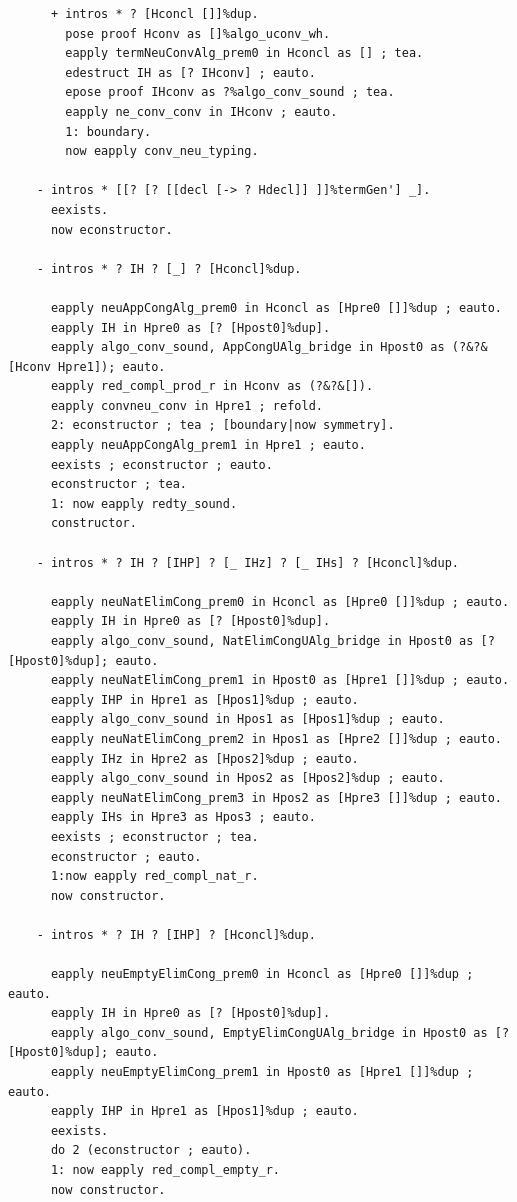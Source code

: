 \documentclass[10pt,a4paper]{amsart}
\begin{document}
\begin{lstlisting}
      + intros * ? [Hconcl []]%dup.
        pose proof Hconv as []%algo_uconv_wh.
        eapply termNeuConvAlg_prem0 in Hconcl as [] ; tea.
        edestruct IH as [? IHconv] ; eauto.
        epose proof IHconv as ?%algo_conv_sound ; tea.
        eapply ne_conv_conv in IHconv ; eauto.
        1: boundary.
        now eapply conv_neu_typing.

    - intros * [[? [? [[decl [-> ? Hdecl]] ]]%termGen'] _].
      eexists.
      now econstructor.

    - intros * ? IH ? [_] ? [Hconcl]%dup.

      eapply neuAppCongAlg_prem0 in Hconcl as [Hpre0 []]%dup ; eauto.
      eapply IH in Hpre0 as [? [Hpost0]%dup].
      eapply algo_conv_sound, AppCongUAlg_bridge in Hpost0 as (?&?&[Hconv Hpre1]); eauto.
      eapply red_compl_prod_r in Hconv as (?&?&[]).
      eapply convneu_conv in Hpre1 ; refold.
      2: econstructor ; tea ; [boundary|now symmetry].
      eapply neuAppCongAlg_prem1 in Hpre1 ; eauto.
      eexists ; econstructor ; eauto.
      econstructor ; tea.
      1: now eapply redty_sound.
      constructor.

    - intros * ? IH ? [IHP] ? [_ IHz] ? [_ IHs] ? [Hconcl]%dup.

      eapply neuNatElimCong_prem0 in Hconcl as [Hpre0 []]%dup ; eauto.
      eapply IH in Hpre0 as [? [Hpost0]%dup].
      eapply algo_conv_sound, NatElimCongUAlg_bridge in Hpost0 as [? [Hpost0]%dup]; eauto.
      eapply neuNatElimCong_prem1 in Hpost0 as [Hpre1 []]%dup ; eauto.
      eapply IHP in Hpre1 as [Hpos1]%dup ; eauto.
      eapply algo_conv_sound in Hpos1 as [Hpos1]%dup ; eauto.
      eapply neuNatElimCong_prem2 in Hpos1 as [Hpre2 []]%dup ; eauto.
      eapply IHz in Hpre2 as [Hpos2]%dup ; eauto.
      eapply algo_conv_sound in Hpos2 as [Hpos2]%dup ; eauto.
      eapply neuNatElimCong_prem3 in Hpos2 as [Hpre3 []]%dup ; eauto.
      eapply IHs in Hpre3 as Hpos3 ; eauto.
      eexists ; econstructor ; tea.
      econstructor ; eauto.
      1:now eapply red_compl_nat_r.
      now constructor.

    - intros * ? IH ? [IHP] ? [Hconcl]%dup.

      eapply neuEmptyElimCong_prem0 in Hconcl as [Hpre0 []]%dup ; eauto.
      eapply IH in Hpre0 as [? [Hpost0]%dup].
      eapply algo_conv_sound, EmptyElimCongUAlg_bridge in Hpost0 as [? [Hpost0]%dup]; eauto.
      eapply neuEmptyElimCong_prem1 in Hpost0 as [Hpre1 []]%dup ; eauto.
      eapply IHP in Hpre1 as [Hpos1]%dup ; eauto.
      eexists.
      do 2 (econstructor ; eauto).
      1: now eapply red_compl_empty_r.
      now constructor.


\end{lstlisting}
\end{document}
